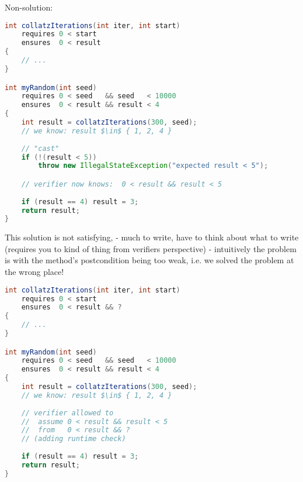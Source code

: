 Non-solution:
\begin{lstlisting}[language=Java]
int collatzIterations(int iter, int start)
    requires 0 < start
    ensures  0 < result
{
    // ...
}

int myRandom(int seed)
    requires 0 < seed   && seed   < 10000
    ensures  0 < result && result < 4
{
    int result = collatzIterations(300, seed);
    // we know: result $\in$ { 1, 2, 4 }
    
    // "cast"
    if (!(result < 5))
        throw new IllegalStateException("expected result < 5");

    // verifier now knows:  0 < result && result < 5 
    
    if (result == 4) result = 3;
    return result;
}
\end{lstlisting}
This solution is not satisfying, 
- much to write, have to think about what to write (requires you to kind of thing from verifiers perspective)
- intuitively the problem is with the method's postcondition being too weak, i.e. we solved the problem at the wrong place!


\begin{lstlisting}[language=Java]
int collatzIterations(int iter, int start)
    requires 0 < start
    ensures  0 < result && ?
{
    // ...
}

int myRandom(int seed)
    requires 0 < seed   && seed   < 10000
    ensures  0 < result && result < 4
{
    int result = collatzIterations(300, seed);
    // we know: result $\in$ { 1, 2, 4 }
    
    // verifier allowed to
    //  assume 0 < result && result < 5
    //  from   0 < result && ?
    // (adding runtime check)
    
    if (result == 4) result = 3;
    return result;
}
\end{lstlisting}



